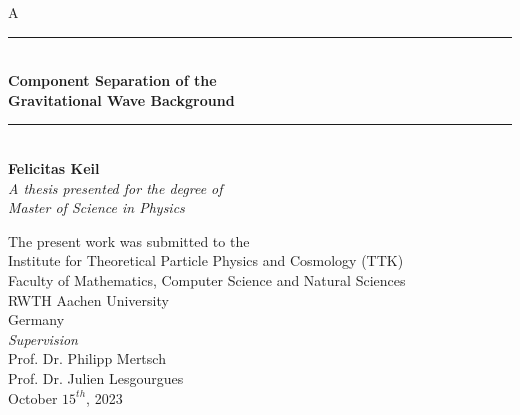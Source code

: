 \documentclass[twoside, 11pt, English, openany]{book}
\begin{document}
\begin{titlepage}
    \thispagestyle{fancy}
    \begin{spacing}{1.5}
        \color{white}
        A \\
        \color{black}
    \begin{center}
        \vspace{3cm}
        \noindent\rule{6cm}{0.4pt} \\
       {\LARGE \textbf{ Component Separation of the \\ 
       \vspace{0.5cm}
      Gravitational Wave Background}}
        \noindent\rule{6cm}{0.4pt} \\
        
       \vspace{1cm}
       \textbf{Felicitas Keil} \\
       \vspace{1cm}        
       \textit{A thesis presented for the degree of\\
       Master of Science in Physics}
            
       \vspace{0.8cm}
       The present work was submitted to the \\
        Institute for Theoretical Particle Physics and Cosmology (TTK)\\
       Faculty of Mathematics, Computer Science and Natural Sciences \\
       RWTH Aachen University\\
       Germany\\
       \vspace{1cm}
       \textit{Supervision} \\
       Prof. Dr. Philipp Mertsch \\
       Prof. Dr. Julien Lesgourgues \\
       \vspace{1cm}
       October $15^{th}$, 2023
    \end{center}
    \end{spacing}
\end{titlepage}

\newpage

\newpage
{}
\printbibliography
\end{document}
